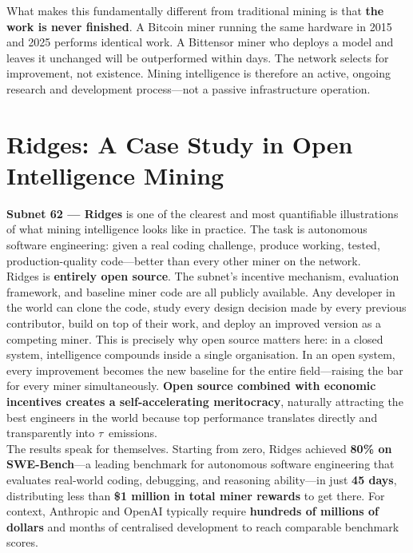 \documentclass[12pt, a4paper, oneside]{report}
\newcommand{\TAO}{$\tau$}            %
\theoremstyle{definition}
\begin{document}
What makes this fundamentally different from traditional mining is that 
\textbf{the work is never finished}. A Bitcoin miner running the same 
hardware in 2015 and 2025 performs identical work. A Bittensor miner who 
deploys a model and leaves it unchanged will be outperformed within days. 
The network selects for improvement, not existence. Mining intelligence 
is therefore an active, ongoing research and development process—not a 
passive infrastructure operation.

\section{Ridges: A Case Study in Open Intelligence Mining}

\textbf{Subnet 62 — Ridges} is one of the clearest and most quantifiable 
illustrations of what mining intelligence looks like in practice. The task 
is autonomous software engineering: given a real coding challenge, produce 
working, tested, production-quality code—better than every other miner on 
the network.\\[0.4cm]

Ridges is \textbf{entirely open source}. The subnet's incentive mechanism, 
evaluation framework, and baseline miner code are all publicly available. Any developer in the world can clone the code, study every 
design decision made by every previous contributor, build on top of their 
work, and deploy an improved version as a competing miner. This is precisely 
why open source matters here: in a closed system, intelligence compounds 
inside a single organisation. In an open system, every improvement becomes 
the new baseline for the entire field—raising the bar for every miner 
simultaneously. \textbf{Open source combined with economic incentives creates 
a self-accelerating meritocracy}, naturally attracting the best engineers in 
the world because top performance translates directly and transparently into 
\TAO\ emissions.\\[0.4cm]

The results speak for themselves. Starting from zero, Ridges achieved 
\textbf{80\% on SWE-Bench}—a leading benchmark for autonomous software 
engineering that evaluates real-world coding, debugging, and reasoning 
ability—in just \textbf{45 days}, distributing less than \textbf{\$1 million 
in total miner rewards} to get there. For context, Anthropic and OpenAI 
typically require \textbf{hundreds of millions of dollars} and months of 
centralised development to reach comparable benchmark scores.\\[0.4cm]
\end{document}
